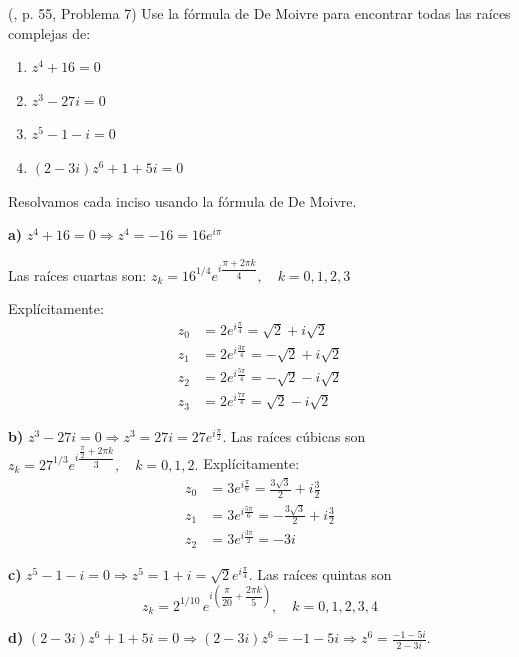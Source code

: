 \begin{prob}  (\cite{andreescu2014complex}, p. 55, Problema 7) Use la fórmula de De Moivre para encontrar todas las raíces complejas de:
\begin{multicols}{2}
\begin{enumerate}[$a)$]
\item $z^4+16=0$
\item $z^3-27i=0$
\item $z^5-1-i=0$
\item $(2-3i)z^6+1+5i=0$
\end{enumerate}
\end{multicols}
\begin{myproof}
Resolvamos cada inciso usando la fórmula de De Moivre.

\textbf{a)} $z^4 + 16 = 0\Rightarrow z^4 = -16 = 16 e^{i\pi}$

Las raíces cuartas son: \(
z_k = 16^{1/4} e^{i \dfrac{\pi + 2\pi k}{4}}, \quad k = 0,1,2,3
\)

Explícitamente:
\[
\boxed{
\begin{aligned}
z_0 &= 2 e^{i\frac{\pi}{4}} = \sqrt{2} + i\sqrt{2} \\
z_1 &= 2 e^{i\frac{3\pi}{4}} = -\sqrt{2} + i\sqrt{2} \\
z_2 &= 2 e^{i\frac{5\pi}{4}} = -\sqrt{2} - i\sqrt{2} \\
z_3 &= 2 e^{i\frac{7\pi}{4}} = \sqrt{2} - i\sqrt{2}
\end{aligned}
}
\]

\vspace{1em}

\textbf{b)} $z^3 - 27i = 0 \Rightarrow z^3 = 27i = 27 e^{i\frac{\pi}{2}}.$
Las raíces cúbicas son \( z_k = 27^{1/3} e^{i \dfrac{\frac{\pi}{2} + 2\pi k}{3}}, \quad k=0,1,2.
\)
Explícitamente: 
\[
\boxed{
\begin{aligned}
z_0 &= 3 e^{i\frac{\pi}{6}} = \frac{3\sqrt{3}}{2} + i\frac{3}{2} \\
z_1 &= 3 e^{i\frac{5\pi}{6}} = -\frac{3\sqrt{3}}{2} + i\frac{3}{2} \\
z_2 &= 3 e^{i\frac{3\pi}{2}} = -3i
\end{aligned}
}
\]


\textbf{c)} $z^5 - 1 - i = 0\Rightarrow z^5 = 1 + i = \sqrt{2} e^{i\frac{\pi}{4}}.$ Las raíces quintas son 
\[
\boxed{
z_k = 2^{1/10} \, e^{i\left( \dfrac{\pi}{20} + \dfrac{2\pi k}{5} \right ) }, \quad k=0,1,2,3,4
}
\]


\textbf{d)} $(2-3i)z^6 + 1 + 5i = 0\Rightarrow (2-3i)z^6 = -1 - 5i\Rightarrow z^6 = \frac{-1 - 5i}{2 - 3i}.$



\end{myproof}
\end{prob}
